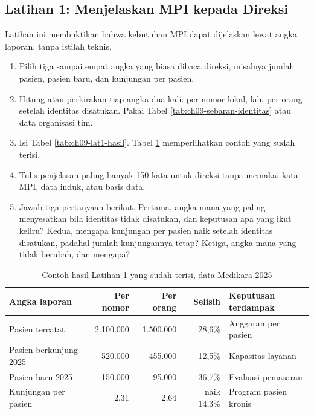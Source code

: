 \subsection*{Latihan 1: Menjelaskan MPI kepada Direksi}

Latihan ini membuktikan bahwa kebutuhan MPI dapat dijelaskan lewat angka
laporan, tanpa istilah teknis.

\begin{enumerate}
  \item Pilih tiga sampai empat angka yang biasa dibaca direksi, misalnya
        jumlah pasien, pasien baru, dan kunjungan per pasien.
  \item Hitung atau perkirakan tiap angka dua kali: per nomor lokal, lalu
        per orang setelah identitas disatukan. Pakai Tabel
        \ref{tab:ch09-sebaran-identitas} atau data organisasi tim.
  \item Isi Tabel \ref{tab:ch09-lat1-hasil}. Tabel \ref{tab:ch09-lat1-contoh}
        memperlihatkan contoh yang sudah terisi.
  \item Tulis penjelasan paling banyak 150 kata untuk direksi tanpa memakai
        kata MPI, data induk, atau basis data.
  \item Jawab tiga pertanyaan berikut. Pertama, angka mana yang paling
        menyesatkan bila identitas tidak disatukan, dan keputusan apa yang
        ikut keliru? Kedua, mengapa kunjungan per pasien naik setelah
        identitas disatukan, padahal jumlah kunjungannya tetap? Ketiga, angka
        mana yang tidak berubah, dan mengapa?
\end{enumerate}

\begin{table}[!htb]
  \centering
  \caption{Contoh hasil Latihan 1 yang sudah terisi, data Medikara 2025}
  \label{tab:ch09-lat1-contoh}
  \small
  \begin{tabularx}{\textwidth}{Xrrrl}
    \hline
    \textbf{Angka laporan} & \textbf{Per nomor} & \textbf{Per orang} & \textbf{Selisih} & \textbf{Keputusan terdampak} \\
    \hline
    Pasien tercatat & 2.100.000 & 1.500.000 & 28,6\% & Anggaran per pasien \\
    \hline
    Pasien berkunjung 2025 & 520.000 & 455.000 & 12,5\% & Kapasitas layanan \\
    \hline
    Pasien baru 2025 & 150.000 & 95.000 & 36,7\% & Evaluasi pemasaran \\
    \hline
    Kunjungan per pasien & 2,31 & 2,64 & naik 14,3\% & Program pasien kronis \\
    \hline
  \end{tabularx}
\end{table}

